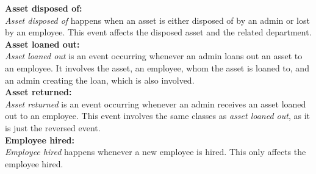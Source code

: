 \textbf{Asset disposed of:}\\
\textit{Asset disposed of} happens when an asset is either disposed of by an admin or lost by an employee. This event affects the disposed asset and the related department. \\

\textbf{Asset loaned out:}\\
\textit{Asset loaned out} is an event occurring whenever an admin loans out an asset to an employee. It involves the asset, an employee, whom the asset is loaned to, and an admin creating the loan, which is also involved.\\

\textbf{Asset returned:}\\
\textit{Asset returned} is an event occurring whenever an admin receives an asset loaned out to an employee. This event involves the same classes as \textit{asset loaned out}, as it is just the reversed event.\\

\textbf{Employee hired:}\\
\textit{Employee hired} happens whenever a new employee is hired. This only affects the employee hired.\\

